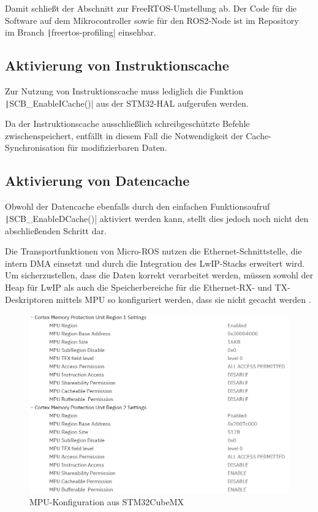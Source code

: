 Damit schließt der Abschnitt zur FreeRTOS-Umstellung ab. Der Code für die
Software auf dem Mikrocontroller sowie für den ROS2-Node ist im
Repository~\cite{mecarover_freertos_profiling} im Branch
\texttt|freertos-profiling| einsehbar.

\subsection{Aktivierung von Instruktionscache}

Zur Nutzung von Instruktionscache muss lediglich die Funktion
\texttt|SCB_EnableICache()| aus der STM32-HAL aufgerufen werden.

Da der Instruktionscache ausschließlich schreibgeschützte Befehle
zwischenspeichert, entfällt in diesem Fall die Notwendigkeit der
Cache-Synchronisation für modifizierbaren Daten.

\subsection{Aktivierung von Datencache}

Obwohl der Datencache ebenfalls durch den einfachen Funktionsaufruf
\texttt|SCB_EnableDCache()| aktiviert werden kann, stellt dies jedoch
noch nicht den abschließenden Schritt dar.

Die Transportfunktionen von Micro-ROS nutzen die Ethernet-Schnittstelle, die
intern DMA einsetzt und durch die Integration des LwIP-Stacks erweitert wird. Um
sicherzustellen, dass die Daten korrekt verarbeitet werden, müssen sowohl der
Heap für LwIP als auch die Speicherbereiche für die Ethernet-RX- und
TX-Deskriptoren mittels \ac{MPU} so konfiguriert werden, dass sie nicht gecacht
werden \cite{STM32H7_LwIP_Examples}.

\begin{figure}[H]
    \centering
    \includegraphics[width=1\textwidth]{assets/mpu_conf_cubemx}
    \caption{MPU-Konfiguration aus STM32CubeMX}
\end{figure}

